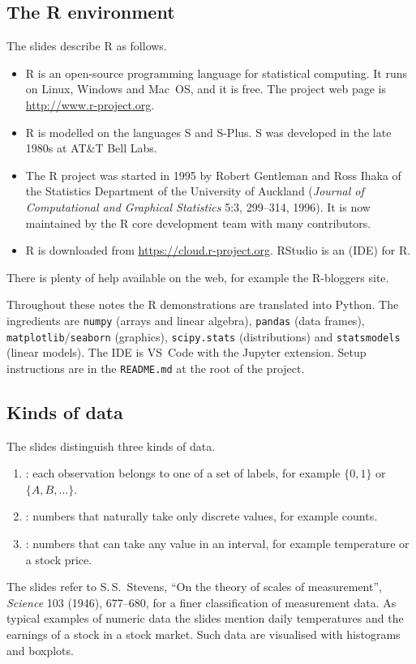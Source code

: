 \subsection{The R environment}
The slides describe R as follows.
\begin{itemize}
  \item R is an open-source programming language for statistical computing. It runs on Linux, Windows and Mac~OS, and it is free. The project web page is \url{http://www.r-project.org}.
  \item R is modelled on the languages S and S-Plus. S was developed in the late 1980s at AT\&T Bell Labs.
  \item The R project was started in 1995 by Robert Gentleman and Ross Ihaka of the Statistics Department of the University of Auckland (\emph{Journal of Computational and Graphical Statistics} 5:3, 299--314, 1996). It is now maintained by the R core development team with many contributors.
  \item R is downloaded from \url{https://cloud.r-project.org}. RStudio is an  (IDE) for R.
\end{itemize}
There is plenty of help available on the web, for example the R-bloggers site.

\begin{note}
Throughout these notes the R demonstrations are translated into Python. The ingredients are
\texttt{numpy} (arrays and linear algebra), \texttt{pandas} (data frames),
\texttt{matplotlib}/\texttt{seaborn} (graphics), \texttt{scipy.stats} (distributions) and
\texttt{statsmodels} (linear models). The IDE is VS~Code with the Jupyter extension. Setup
instructions are in the \texttt{README.md} at the root of the project.
\end{note}

\subsection{Kinds of data}
\begin{definition}\label{def:L01-datatypes}
The slides distinguish three kinds of data.
\begin{enumerate}
  \item {}: each observation belongs to one of a set of labels, for example $\{0,1\}$ or $\{A,B,\dots\}$.
  \item {}: numbers that naturally take only discrete values, for example counts.
  \item {}: numbers that can take any value in an interval, for example temperature or a stock price.
\end{enumerate}
\end{definition}
The slides refer to S.\,S.~Stevens, ``On the theory of scales of measurement'',
\emph{Science} 103 (1946), 677--680, for a finer classification of measurement data. As typical
examples of numeric data the slides mention daily temperatures and the earnings of a stock in a
stock market. Such data are visualised with histograms and boxplots.

